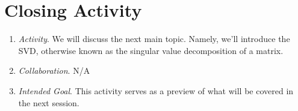\documentclass[11pt]{article}
\begin{document}
\section{\centering Closing Activity}
	\begin{enumerate}
		\item \textit{Activity}. We will discuss the next main topic. Namely, we'll introduce the SVD, otherwise known as the singular value decomposition
						of a matrix.
		\item \textit{Collaboration}. N/A
		\item \textit{Intended Goal}. This activity serves as a preview of what will be covered in the next session.
	\end{enumerate}
\end{document}
